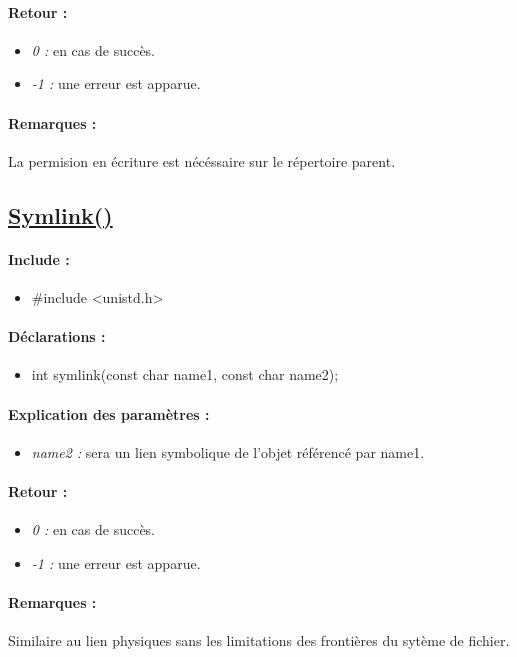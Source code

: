 \documentclass{article}[12pt]
\begin{document}
\paragraph{Retour : }
\begin{itemize}
	\item \emph{0 : } en cas de succès.
	\item \emph{-1 : } une erreur est apparue.
\end{itemize}
\paragraph{Remarques : }
La permision en écriture est nécéssaire sur le répertoire parent. 
\subsection{\href{http://jp.barralis.com/linux-man/man2/symlink.2.php}{Symlink()}}
\paragraph{Include : }
\begin{itemize}
	\item \#include <unistd.h>
\end{itemize}
\paragraph{Déclarations : }
\begin{itemize}
	\item int symlink(const char \* name1, const char \* name2);
\end{itemize}
\paragraph{Explication des paramètres : }
\begin{itemize}
	\item \emph{name2 : } sera un lien symbolique de l'objet référencé par name1.
\end{itemize}
\paragraph{Retour : }
\begin{itemize}
	\item \emph{0 : } en cas de succès.
	\item \emph{-1 : } une erreur est apparue.
\end{itemize}
\paragraph{Remarques : }
Similaire au lien physiques sans les limitations des frontières du sytème de fichier.
\end{document}
